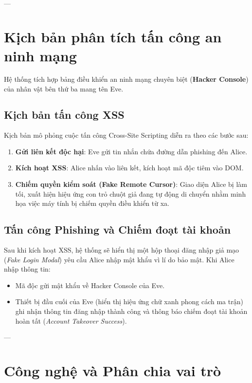 \documentclass[12pt,a4paper]{article}
\begin{document}
---

\section{Kịch bản phân tích tấn công an ninh mạng}
Hệ thống tích hợp bảng điều khiển an ninh mạng chuyên biệt (\textbf{Hacker Console}) của nhân vật bên thứ ba mang tên Eve.

\subsection{Kịch bản tấn công XSS}
Kịch bản mô phỏng cuộc tấn công Cross-Site Scripting diễn ra theo các bước sau:
\begin{enumerate}
    \item \textbf{Gửi liên kết độc hại}: Eve gửi tin nhắn chứa đường dẫn phishing đến Alice.
    \item \textbf{Kích hoạt XSS}: Alice nhấn vào liên kết, kích hoạt mã độc tiêm vào DOM.
    \item \textbf{Chiếm quyền kiểm soát (Fake Remote Cursor)}: Giao diện Alice bị làm tối, xuất hiện hiệu ứng con trỏ chuột giả đang tự động di chuyển nhằm minh họa việc máy tính bị chiếm quyền điều khiển từ xa.
\end{enumerate}

\subsection{Tấn công Phishing và Chiếm đoạt tài khoản}
Sau khi kích hoạt XSS, hệ thống sẽ hiển thị một hộp thoại đăng nhập giả mạo (\textit{Fake Login Modal}) yêu cầu Alice nhập mật khẩu vì lí do bảo mật. Khi Alice nhập thông tin:
\begin{itemize}
    \item Mã độc gửi mật khẩu về Hacker Console của Eve.
    \item Thiết bị đầu cuối của Eve (hiển thị hiệu ứng chữ xanh phong cách ma trận) ghi nhận thông tin đăng nhập thành công và thông báo chiếm đoạt tài khoản hoàn tất (\textit{Account Takeover Success}).
\end{itemize}

---

\section{Công nghệ và Phân chia vai trò}
\end{document}

